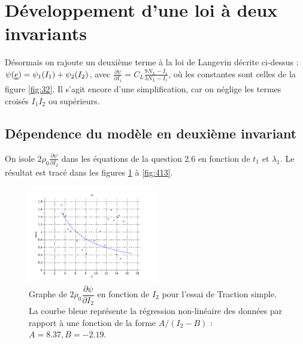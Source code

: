\documentclass[a4paper,11pt]{article}
\newcommand{\FRAC}{\displaystyle\frac}
\newcommand{\tens}{\uuline}
\begin{document}
\section{Développement d'une loi à deux invariants}
Désormais on rajoute un deuxième terme à la loi de Langevin décrite ci-dessus : $\psi(\tens{e}) = \psi_1(I_1) + \psi_2(I_2)$, avec $\FRAC{\partial\psi}{\partial I_1} = C_L\frac{9N_L-I_1}{3N_L-I_1}$, où les constantes sont celles de la figure \ref{fig:32}. Il s'agit encore d'une simplification, car on néglige les termes croisés $I_1I_2$ ou supérieurs.

\subsection{Dépendence du modèle en deuxième invariant}
On isole $2 \rho_0 \frac{\partial\psi}{\partial I_2}$ dans les équations de la question 2.6 en fonction de $t_1$ et $\lambda_1$. Le résultat est tracé dans les figures \ref{fig:411} à \ref{fig:413}.

\begin{figure}[!ht]
\centering
\includegraphics[width=0.5\textwidth]{scilab_prof/q411.pdf}
\caption{Graphe de $2 \rho_0 \dfrac{\partial\psi}{\partial I_2}$ en fonction de $I_2$ pour l'essai de Traction simple. La courbe bleue représente la régression non-linéaire des données par rapport à une fonction de la forme $A/(I_2-B)$ : $A = 8.37, B = -2.19$.}
\label{fig:411}
\end{figure}
%
\end{document}
